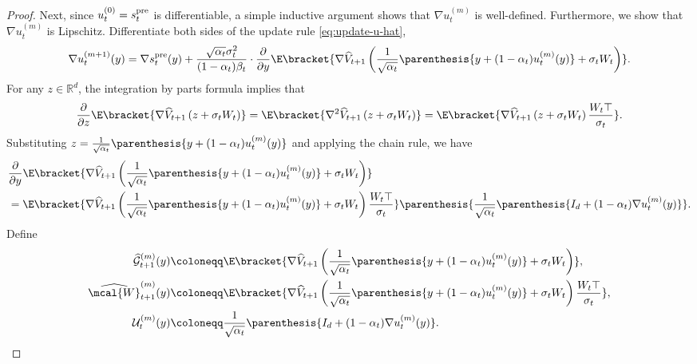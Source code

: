 \documentclass{article}
\newcommand{\R}{\mathbb{R}}
\begin{document}
\begin{proof}
Next, since $u_t^{(0)} = s_t^{\rm pre}$ is differentiable, a simple inductive argument shows that $\nabla u_t^{(m)}$ is well-defined. Furthermore, we show that $ \nabla u_{t}^{(m)} $ is Lipschitz.  Differentiate both sides of the update rule \eqref{eq:update-u-hat},
\begin{align}
    \nabla u_{t}^{(m+1)}(y) = \nabla s_{t}^{\rm pre}(y) + \frac{\sqrt{\alpha_{t}}\sigma_{t}^{2}}{(1 - \alpha_{t})\beta_t}\cdot\frac{\partial}{\partial y} \E\bracket{\nabla \widehat{V}_{t+1}\left(\frac{1}{\sqrt{\alpha_t}}\parenthesis{y + (1 - \alpha_t)u_t^{(m)}(y)} + \sigma_t W_t\right)}. \label{eq:grad-um}
\end{align}
For any $ z \in \R^{d} $, the integration by parts formula implies that
\begin{align}\label{eq:magic}
    \frac{\partial}{\partial z}\E\bracket{\nabla \widehat{V}_{t+1}\left(z + \sigma_t W_t\right)} = \E\bracket{\nabla^{2} \widehat{V}_{t+1}\left(z + \sigma_t W_t\right)} = \E\bracket{\nabla \widehat{V}_{t+1}\left(z + \sigma_t W_t\right)\frac{W_t\top}{\sigma_t}}.
\end{align}
Substituting $ z = \frac{1}{\sqrt{\alpha_t}}\parenthesis{y + (1 - \alpha_t)u_t^{(m)}(y)} $ and applying the chain rule, we have
\begin{align}
    & \frac{\partial}{\partial y}\E\bracket{\nabla \widehat{V}_{t+1}\left(\frac{1}{\sqrt{\alpha_t}}\parenthesis{y + (1 - \alpha_t)u_t^{(m)}(y)} + \sigma_t W_t\right)} \nonumber \\ & = \E\bracket{\nabla \widehat{V}_{t+1}\left(\frac{1}{\sqrt{\alpha_t}}\parenthesis{y + (1 - \alpha_t)u_t^{(m)}(y)} + \sigma_t W_t\right)\frac{W_t\top}{\sigma_t}}\parenthesis{\frac{1}{\sqrt{\alpha_t}}\parenthesis{I_d + (1 - \alpha_t)\nabla u_t^{(m)}(y)}}. \label{eq:grad-E-grad-v}
\end{align}
Define 
\begin{align*}
    \widehat{\mathcal{G}}_{t+1}^{(m)}(y)  & \coloneqq \E\bracket{\nabla \widehat{V}_{t+1}\left(\frac{1}{\sqrt{\alpha_t}}\parenthesis{y + (1 - \alpha_t)u_t^{(m)}(y)} + \sigma_t W_t\right)}, \\
     \widehat{\mcal{W}}_{t+1}^{{(m)}}(y)  & \coloneqq  \E\bracket{\nabla \widehat{V}_{t+1}\left(\frac{1}{\sqrt{\alpha_t}}\parenthesis{y + (1 - \alpha_t)u_t^{(m)}(y)} + \sigma_t W_t\right)\frac{W_t\top}{\sigma_t}}, \\ 
    \mathcal{U}^{(m)}_t(y) & \coloneqq \frac{1}{\sqrt{\alpha_t}}\parenthesis{I_d + (1 - \alpha_t) \nabla u_t^{(m)}(y)}.     
\end{align*}

\end{proof}
\end{document}

